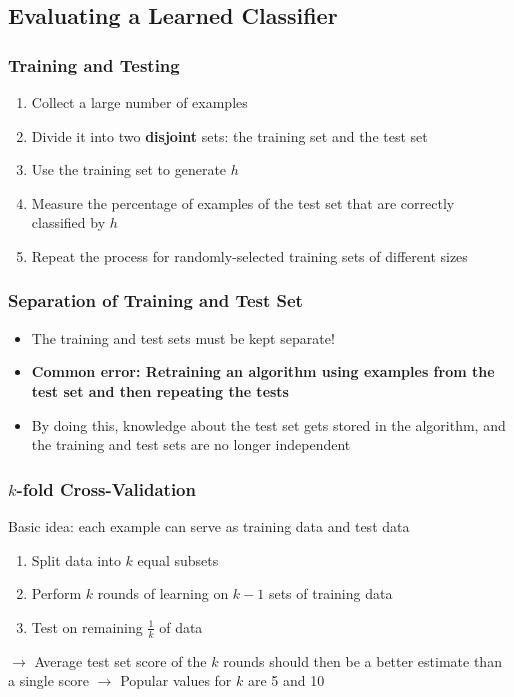 \documentclass[conference]{styles/acmsiggraph}
\begin{document}
        
    \subsection{Evaluating a Learned Classifier}
    
        \subsubsection{Training and Testing}
            \begin{enumerate}
                \item Collect a large number of examples
                \item Divide it into two \textbf{disjoint} sets: the training set and the test set
                \item Use the training set to generate $h$
                \item Measure the percentage of examples of the test set that are correctly classified by $h$
                \item Repeat the process for randomly-selected training sets of different sizes
            \end{enumerate}
        
        \subsubsection{Separation of Training and Test Set}
            \begin{itemize}
                \item The training and test sets must be kept separate!
                \item \textbf{Common error: Retraining an algorithm using examples from the test set and then repeating the tests}
                \item By doing this, knowledge about the test set gets stored in the algorithm, and the training and test sets are no longer independent
            \end{itemize}

\newpage

        \subsubsection{$k$-fold Cross-Validation}
            Basic idea: each example can serve as training data and test data
            \begin{enumerate}
                \item Split data into $k$ equal subsets
                \item Perform $k$ rounds of learning on $k-1$ sets of training data
                \item Test on remaining $\frac{1}{k}$ of data
            \end{enumerate}
            $\rightarrow$ Average test set score of the $k$ rounds should then be a better estimate than a single score\newline
            $\rightarrow$ Popular values for $k$ are 5 and 10
        
\end{document}
